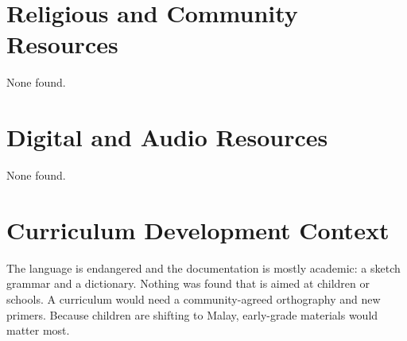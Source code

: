 \documentclass[12pt]{article}
\begin{document}
\section{Religious and Community Resources}
None found.

\section{Digital and Audio Resources}
None found.

\section{Curriculum Development Context}
The language is endangered and the documentation is mostly academic: a sketch grammar and a dictionary. Nothing was found that is aimed at children or schools. A curriculum would need a community-agreed orthography and new primers. Because children are shifting to Malay, early-grade materials would matter most.
\end{document}
